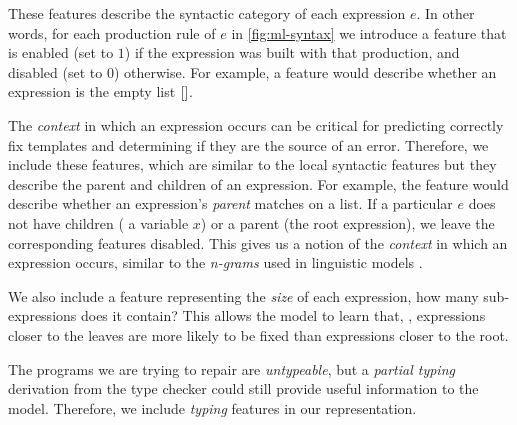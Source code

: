 These features describe the syntactic category of each expression $e$. In other
words, for each production rule of $e$ in \autoref{fig:ml-syntax} we introduce a
feature that is enabled (set to $1$) if the expression was built with that
production, and disabled (set to $0$) otherwise. For example, a \IsNil feature
would describe whether an expression is the empty list $\mathtt{[]}$.


The \emph{context} in which an expression occurs can be critical for predicting
correctly fix templates and determining if they are the source of an error.
Therefore, we include these features, which are similar to the local syntactic
features but they describe the parent and children of an expression. For
example, the \IsCaseListP feature would describe whether an expression's
\emph{parent} matches on a list. If a particular $e$ does not have children (\eg
a variable $x$) or a parent (\ie the root expression), we leave the
corresponding features disabled. This gives us a notion of the \emph{context} in
which an expression occurs, similar to the \emph{n-grams} used in linguistic
models \citep{Hindle2012-hf,Gabel2010-el}.

We also include a feature representing the \emph{size} of each expression, \ie
how many sub-expressions does it contain?
This allows the model to learn that, \eg, expressions closer to the leaves are
more likely to be fixed than expressions closer to the root.

The programs we are trying to repair are \emph{untypeable}, but a \emph{partial
typing} derivation from the type checker could still provide useful information
to the model. Therefore, we include \emph{typing} features in our
representation.


